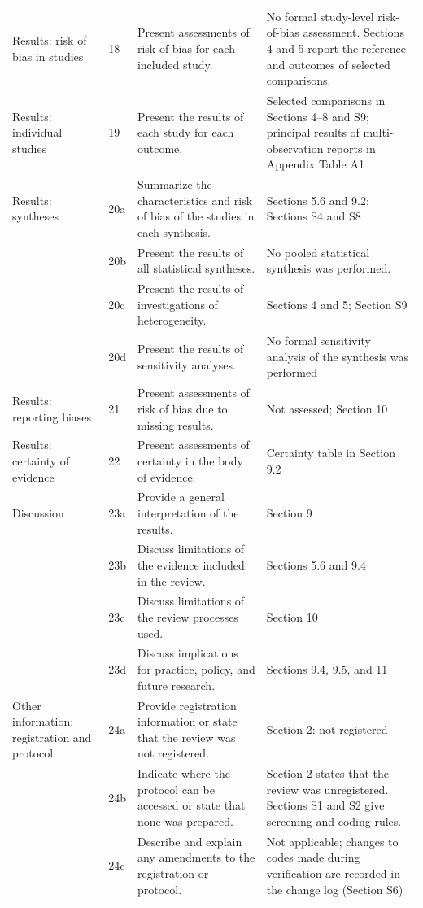 \documentclass[a4paper,11pt]{article}
\begin{document}
\begin{footnotesize}
\begin{longtable}{@{}L{3.0cm}L{0.8cm}L{6.4cm}L{\dimexpr\linewidth-10.2cm-6\tabcolsep\relax}@{}}
Results: risk of bias in studies & 18 & Present assessments of risk of bias for each included study. & No formal study-level risk-of-bias assessment. Sections 4 and 5 report the reference and outcomes of selected comparisons.\\
Results: individual studies & 19 & Present the results of each study for each outcome. & Selected comparisons in Sections 4--8 and S9; principal results of multi-observation reports in Appendix Table A1\\
Results: syntheses & 20a & Summarize the characteristics and risk of bias of the studies in each synthesis. & Sections 5.6 and 9.2; Sections S4 and S8\\
 & 20b & Present the results of all statistical syntheses. & No pooled statistical synthesis was performed.\\
 & 20c & Present the results of investigations of heterogeneity. & Sections 4 and 5; Section S9\\
 & 20d & Present the results of sensitivity analyses. & No formal sensitivity analysis of the synthesis was performed\\
Results: reporting biases & 21 & Present assessments of risk of bias due to missing results. & Not assessed; Section 10\\
Results: certainty of evidence & 22 & Present assessments of certainty in the body of evidence. & Certainty table in Section 9.2\\
Discussion & 23a & Provide a general interpretation of the results. & Section 9\\
 & 23b & Discuss limitations of the evidence included in the review. & Sections 5.6 and 9.4\\
 & 23c & Discuss limitations of the review processes used. & Section 10\\
 & 23d & Discuss implications for practice, policy, and future research. & Sections 9.4, 9.5, and 11\\
Other information: registration and protocol & 24a & Provide registration information or state that the review was not registered. & Section 2: not registered\\
 & 24b & Indicate where the protocol can be accessed or state that none was prepared. & Section 2 states that the review was unregistered. Sections S1 and S2 give screening and coding rules.\\
 & 24c & Describe and explain any amendments to the registration or protocol. & Not applicable; changes to codes made during verification are recorded in the change log (Section S6)\\

\end{longtable}
\end{footnotesize}
\end{document}
